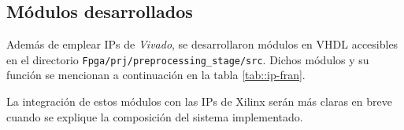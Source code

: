 \documentclass[../../main.tex]{subfiles}
\begin{document}
\subsection{Módulos desarrollados}
Además de emplear IPs de \textit{Vivado}, se desarrollaron módulos en VHDL accesibles en el directorio \texttt{Fpga/prj/preprocessing\_stage/src}. Dichos módulos y su función se mencionan a continuación en la tabla \ref{tab::ip-fran}.

La integración de estos módulos con las IPs de Xilinx serán más claras en breve cuando se explique la composición del sistema implementado.

\begin{table}[H]
\end{table}
\end{document}

